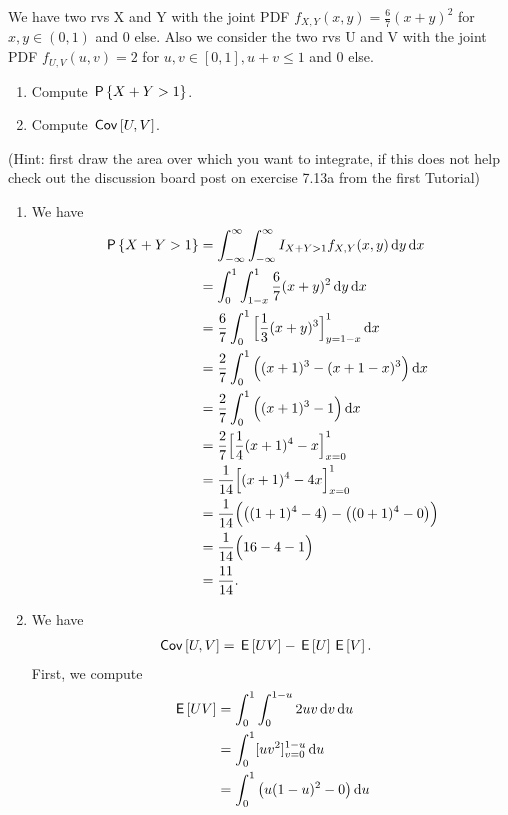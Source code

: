 \begin{exercise}
We have two rvs X and Y with the joint PDF $f_{X,Y}(x,y) = \frac{6}{7}(x+y)^2$ for $x, y \in (0,1)$ and 0 else. Also we consider the two rvs U and V with the joint PDF $f_{U,V}(u,v) = 2$ for $u, v \in [0,1], u+v \leq 1$ and 0 else.
\begin{enumerate}
\item Compute $\P{X+Y>1}$.
\item Compute $\cov{U,V}$.
\end{enumerate}
(Hint: first draw the area over which you want to integrate, if this does not help check out the discussion board post on exercise 7.13a from the first Tutorial)
\begin{solution}
\begin{enumerate}
    \item We have
    \begin{align}
        \P{X+Y>1} &= \int_{-\infty}^\infty \int_{-\infty}^\infty I_{X + Y > 1} f_{X,Y}(x,y) \d y \d x \\
        &= \int_{0}^1 \int_{1-x}^1  \frac{6}{7}(x+y)^2 \d y \d x \\
        &=\frac{6}{7} \int_{0}^1 \Big[\frac{1}{3} (x+y)^3 \Big]_{y=1-x}^1 \d x \\
        &=\frac{2}{7} \int_{0}^1 \Big( (x+1)^3 - (x + 1 - x)^3 \Big) \d x \\
        &=\frac{2}{7} \int_{0}^1 \Big( (x+1)^3 - 1 \Big) \d x \\
        &=\frac{2}{7} \Big[ \frac{1}{4}(x+1)^4 - x \Big]_{x=0}^1 \\
        &=\frac{1}{14}\Big[ (x+1)^4 - 4x \Big]_{x=0}^1 \\
        &=\frac{1}{14} \Big( \big( (1+1)^4 - 4\big) - \big((0+1)^4 - 0 \big) \Big) \\
        &=\frac{1}{14} \Big( 16 - 4 - 1 \Big) \\
        &= \frac{11}{14}.
    \end{align}
    \item We have
    \begin{align}
        \cov{U,V} &= \E{UV} - \E{U}\E{V}.
    \end{align}
    First, we compute
    \begin{align}
        \E{UV} &= \int_0^1 \int_0^{1-u} 2 uv \d v \d u \\
        &= \int_0^1 [uv^2]_{v=0}^{1-u} \d u \\
        &= \int_0^1 \big( u(1-u)^2 - 0\big) \d u \\

\end{align}
\end{enumerate}
\end{solution}
\end{exercise}
